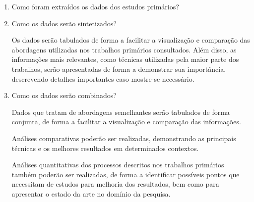 \documentclass[a4paper,11pt]{article}
\begin{document}
\begin{enumerate}
\item{Como foram extraídos os dados dos estudos primários?}

\item{Como os dados serão sintetizados?}

Os dados serão tabulados de forma a facilitar a visualização e comparação das abordagens utilizadas nos trabalhos primários consultados. Além disso, as informações mais relevantes, como técnicas utilizadas pela maior parte dos trabalhos, serão apresentadas de forma a demonstrar sua importância, descrevendo detalhes importantes caso mostre-se necessário.

\item{Como os dados serão combinados?}

Dados que tratam de abordagens semelhantes serão tabulados de forma conjunta, de forma a facilitar a visualização e comparação das informações.

Análises comparativas poderão ser realizadas, demonstrando as principais técnicas e os melhores resultados em determinados contextos.

Análises quantitativas dos processos descritos nos trabalhos primários também poderão ser realizadas, de forma a identificar possíveis pontos que necessitam de estudos para melhoria dos resultados, bem como para apresentar o estado da arte no domínio da pesquisa.

\end{enumerate}


\end{document}
